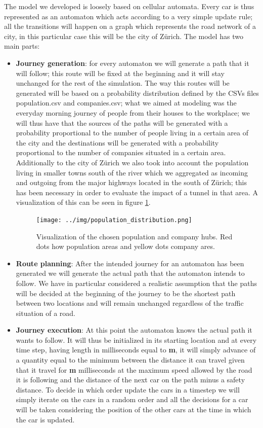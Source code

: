 \documentclass[11pt]{article}
\begin{document}
The model we developed is loosely based on cellular automata. Every car is thus represented as an automaton which acts according to a very simple update rule; all the transitions will happen on a graph which represents the road network of a city, in this particular case this will be the city of Z\"urich. The model has two main parts:
\begin{itemize}
\item \textbf{Journey generation}: for every automaton we will generate a path that it will follow; this route will be fixed at the beginning and it will stay unchanged for the rest of the simulation. The way this routes will be generated will be based on a probability distribution defined by the CSVs files population.csv and companies.csv; what we aimed at modeling was the everyday morning journey of people from their houses to the workplace; we will thus have that the sources of the paths will be generated with a probability proportional to the number of people living in a certain area of the city and the destinations will be generated with a probability proportional to the number of companies situated in a certain area. Additionally to the city of Z\"urich we also took into account the population living in smaller towns south of the river which we aggregated as incoming and outgoing from the major highways located in the south of Z\"urich; this has been necessary in order to evaluate the impact of a tunnel in that area.
A visualization of this can be seen in figure \ref{fig:pop_data}.

\begin{figure}[tbh]
	\begin{center}
		\texttt{[image: ../img/population\_distribution.png]}
	\end{center}
	\caption{Visualization of the chosen population and company hubs. Red dots how population areas and yellow dots company ares.}
	\label{fig:pop_data}
\end{figure}

\item \textbf{Route planning}:  After the intended journey for an automaton has been generated we will generate the actual path that the automaton intends to follow. We have in particular considered a realistic assumption that the paths will be decided at the beginning of the journey to be the shortest path between two locations and will remain unchanged regardless of the traffic situation of a road.
\item \textbf{Journey execution}: At this point the automaton knows the actual path it wants to follow. It will thus be initialized in its starting location and at every time step, having length in milliseconds equal to \textbf{m}, it will simply advance of a quantity equal to the minimum between the distance it can travel given that it travel for \textbf{m} milliseconds at the maximum speed allowed by the road it is following and the distance of the next car on the path minus a safety distance. To decide in which order update the cars in a timestep we will simply iterate on the cars in a random order and all the decisions for a car will be taken considering the position of the other cars at the time in which the car is updated.
\end{itemize}
\end{document}
